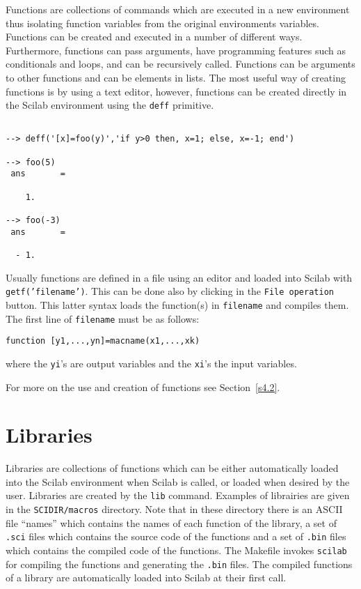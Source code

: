  Functions are collections of commands which are executed in a
new environment thus isolating function variables from the original
environments variables.  Functions
can be created and executed in a number of different ways.
Furthermore, functions can pass arguments, have programming features
such as conditionals and loops, and can be recursively called.
Functions can be arguments
to other functions and can be elements in lists.  The most useful
way of creating functions is by using a text editor, however, functions
can be created directly in the Scilab environment using the 
{\tt deff} primitive.
\begin{verbatim}
 
--> deff('[x]=foo(y)','if y>0 then, x=1; else, x=-1; end')
 
--> foo(5)
 ans       =
 
    1.  
 
--> foo(-3)
 ans       =
 
  - 1.  
\end{verbatim}
Usually functions are defined in a file using an editor and loaded
into Scilab with {\tt getf('filename')}.
This can be done also by clicking in the {\tt File operation} button.
This latter syntax loads the function(s) in {\tt filename} and compiles
them.
The first line of {\tt filename} must be as follows:
\begin{verbatim}
function [y1,...,yn]=macname(x1,...,xk)
\end{verbatim}
where the {\tt yi}'s are output variables and the {\tt xi}'s the
input variables.

For more on the use and creation of functions see Section~\ref{s4.2}.

\section{Libraries}
\label{s2.7}

	Libraries are collections of functions which can be either 
automatically loaded into the Scilab environment when
Scilab is called, or loaded when desired by the user.  
Libraries are created by the {\tt lib} command. Examples of librairies
are given in the {\tt SCIDIR/macros} directory. Note that in these
directory there is an ASCII file ``names'' which contains the names
of each function of the library, a set of {\tt .sci} files which
contains the source code of the functions and a set of {\tt .bin} files
which contains the compiled code of the functions. The Makefile invokes
{\tt scilab} for compiling the functions and generating the {\tt .bin}
files. The compiled functions of a library are automatically loaded 
into Scilab at their first call.

